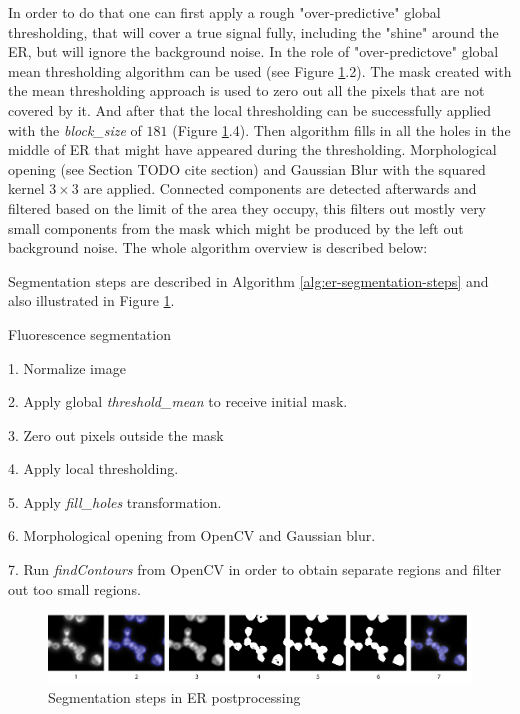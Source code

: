 In order to do that one can first apply a rough "over-predictive" global thresholding, that will cover a true signal fully, including the "shine" around the ER, but will ignore the background noise. In the role of "over-predictove" global mean thresholding algorithm can be used (see Figure \ref{fig:er-segmentation-steps}.2). The mask created with the mean thresholding approach is used to zero out all the pixels that are not covered by it. And after that the local thresholding can be successfully applied with the \textit{block\_size} of $181$ (Figure \ref{fig:er-segmentation-steps}.4). Then  algorithm fills in all the holes in the middle of ER that might have appeared during the thresholding. Morphological opening (see Section TODO cite section) and Gaussian Blur with the squared kernel $3 \times 3$ are applied. Connected components are detected afterwards and filtered based on the limit of the area they occupy, this filters out mostly very small components from the mask which might be produced by the left out background noise. The whole algorithm overview is described below:

Segmentation steps are described in Algorithm \ref{alg:er-segmentation-steps} and also illustrated in Figure \ref{fig:er-segmentation-steps}.

\begin{algorithm}
    \caption{Fluorescence segmentation}
    \begin{algorithmic}
    \item 1. Normalize image
    \item 2. Apply global \textit{threshold\_mean} to receive initial mask.
    \item 3. Zero out pixels outside the mask
    \item 4. Apply local thresholding.  
    \item 5. Apply \textit{fill\_holes} transformation.
    \item 6. Morphological opening from OpenCV and Gaussian blur.
    \item 7. Run \textit{findContours} from OpenCV in order to obtain separate regions and filter out too small regions.
    \end{algorithmic}
    \label{alg:er-segmentation-steps}
\end{algorithm}    

\begin{figure}[htb]
    \begin{center}
        \includegraphics[width=\linewidth]{bilder/ER/segmentation/segmentation.png}
        \caption{Segmentation steps in ER postprocessing}\label{fig:er-segmentation-steps}
    \end{center}
\end{figure}